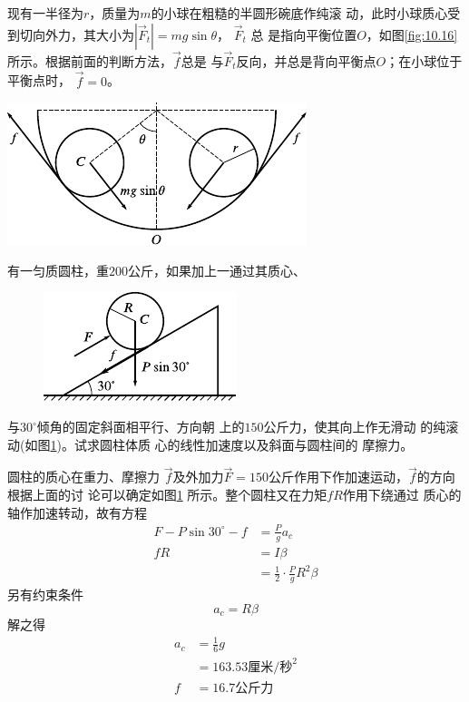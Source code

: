 现有一半径为$ r $，质量为$ m $的小球在粗糙的半圆形碗底作纯滚
动，此时小球质心受到切向外力，其大小为$  | \vec{F} _ t | = m g \sin \theta  $， $ \vec{F} _ t $ 总
是指向平衡位置$ O $，如图\ref{fig:10.16} 所示。根据前面的判断方法，$\vec{f}$总是
与$ \vec{F} _ t $反向，并总是背向平衡点$ O $；在小球位于平衡点时， $ \vec{f} = 0 $。

\begin{figurex}
    \centering
    \includegraphics{figure/fig10.16}
    \caption{}
    \label{fig:10.16}
\end{figurex}

\clearpage
\example 有一匀质圆柱，重$ 200 $公斤，如果加上一通过其质心、
\begin{figure}
    \centering
    \includegraphics{figure/fig10.17}
    \caption{}
    \label{fig:10.17}
\end{figure}
与$ 30^\circ $倾角的固定斜面相平行、方向朝
上的$ 150 $公斤力，使其向上作无滑动
的纯滚动(如图\ref{fig:10.17})。试求圆柱体质
心的线性加速度以及斜面与圆柱间的
摩擦力。

\solution 圆柱的质心在重力、摩擦力
$\vec{f}$及外加力$ \vec{F}=150 $公斤作用下作加速运动，$\vec{f}$的方向根据上面的讨
论可以确定如图\ref{fig:10.17} 所示。整个圆柱又在力矩$ fR $作用下绕通过
质心的轴作加速转动，故有方程
\begin{equation*}
    \begin{split}
        F - P \sin 3 0 ^ { \circ } - f &= \frac { P } { g } a _ { c } \\
        f R &= I \beta \\
            &= \frac { 1 } { 2 } \cdot \frac { P } { g } R ^ { 2 } \beta
    \end{split}
\end{equation*}
另有约束条件
\begin{equation*}
    a _ { c } = R \beta
\end{equation*}
解之得
\begin{equation*}
    \begin{split}
        a _ { c } &= \frac { 1 } { 6 } g \\
                  &= 1 6 3 . 5  3 \text{厘米/秒} ^ 2 \\
                f &= 1 6 . 7  \text{公斤力}
    \end{split}
\end{equation*}

